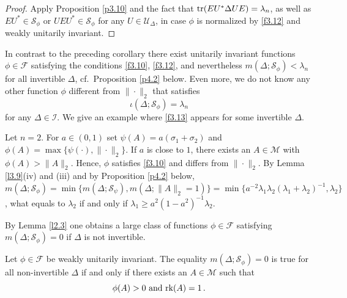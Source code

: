 \documentclass{amsart}
\begin{document}
\begin{proof}
Apply Proposition \ref{p3.10} and the fact that ${\rm tr}(EU^*\Delta UE) = \lambda_n$, as well as $EU^* \in {\mathcal S}_\phi$ or $UEU^* \in {\mathcal S}_\phi$ for any $U \in {\mathcal U}_\Delta$, in case $\phi$ is normalized by \eqref{f3.12} and weakly unitarily invariant.
\end{proof}
 
In contrast to the preceding corollary there exist unitarily invariant functions $\phi \in \mathcal F$ satisfying the conditions \eqref{f3.10}, \eqref{f3.12}, and nevertheless $m( \Delta ; {\mathcal S}_\phi ) < \lambda_n$ for all invertible $\Delta$, cf.~Proposition \ref{p4.2} below. Even more, we do not know any other function $\phi$ different from $\| \cdot \|_2$ that satisfies 
\begin{equation} \label{f3.13}
      \iota(\Delta ; {\mathcal S}_\phi ) = \lambda_n
\end{equation}
for any $\Delta \in {\mathcal I}$. We give an example where \eqref{f3.13} appears for some invertible $\Delta$.
       
\begin{exe}
Let $n=2$. For $a \in (0,1)$ set $\psi(A) = a (\sigma_1+\sigma_2)$ and $\phi(A) = \max \{ \psi( \cdot ), \| \cdot \|_2 \}$. If $a$ is close to $1$,  there exists an $A \in \mathcal M$ with $\phi(A) > \|A\|_2$. Hence, $\phi$ satisfies \eqref{f3.10} and differs from $\| \cdot \|_2$. By Lemma \ref{l3.9}(iv) and (iii) and by Proposition \ref{p4.2} below, $m(\Delta ; {\mathcal S}_\phi ) = \min \{ m(\Delta ; {\mathcal S}_\psi ), m(\Delta ; \|A\|_2=1) \} = \min \{ a^{-2} \lambda_1 \lambda_2 (\lambda_1+\lambda_2)^{-1}, \lambda_2\}$, what equals to $\lambda_2$ if and only if $\lambda_1 \geq a^2(1-a^2)^{-1} \lambda_2$. 
\end{exe}

By Lemma \ref{l2.3} one obtains a large class of functions $\phi \in \mathcal F$ satisfying $m(\Delta ; {\mathcal S}_\phi )=0$ if $\Delta$ is not invertible. 

\begin{lem} \label{l3.14}
   Let $\phi \in \mathcal F$ be weakly unitarily invariant. The equality $m(\Delta ; {\mathcal S}_\phi )=0$ is true for all non-invertible $\Delta$ if and only if there exists an $A \in \mathcal M$ such that 
   \begin{equation} \label{f3.14}
        \phi(A) > 0 \,\, {\rm and} \,\,  {\rm rk}(A)=1 \, .
   \end{equation}
\end{lem}
\end{document}

